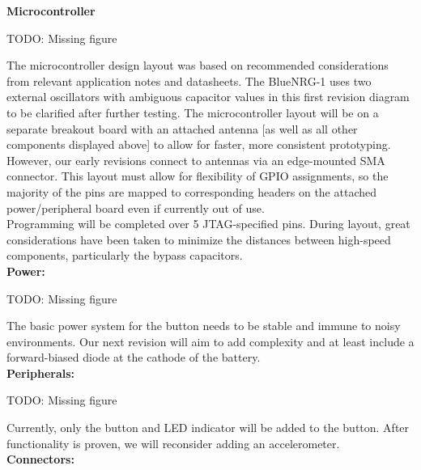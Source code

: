 \documentclass[journal,compsoc]{IEEEtran}
\begin{document}
\textbf {Microcontroller}

TODO: Missing figure

\noindent The microcontroller design layout was based on recommended considerations from relevant application notes and datasheets.  The BlueNRG-1 uses two external oscillators with ambiguous capacitor values in this first revision diagram to be clarified after further testing.  The microcontroller layout will be on a separate breakout board with an attached antenna [as well as all other components displayed above] to allow for faster, more consistent prototyping.  However, our early revisions connect to antennas via an edge-mounted SMA connector.  This layout must allow for flexibility of GPIO assignments, so the majority of the pins are mapped to corresponding headers on the attached power/peripheral board even if currently out of use.\\

\noindent Programming will be completed over 5 JTAG-specified pins.  During layout, great considerations have been taken to minimize the distances between high-speed components, particularly the bypass capacitors.\\

\noindent \textbf {Power:}

TODO: Missing figure

\noindent The basic power system for the button needs to be stable and immune to noisy environments.  Our next revision will aim to add complexity and at least include a forward-biased diode at the cathode of the battery.\\

\noindent \textbf {Peripherals:}

TODO: Missing figure

\noindent Currently, only the button and LED indicator will be added to the button.  After functionality is proven, we will reconsider adding an accelerometer.\\

\noindent \textbf {Connectors:}
\end{document}
